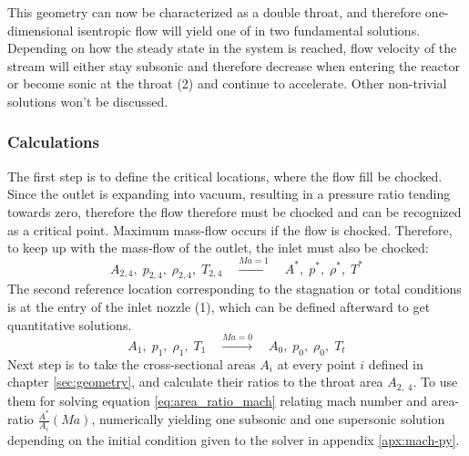 	This geometry can now be characterized as a double throat, and therefore one-dimensional isentropic flow will yield one of in two fundamental solutions.
	Depending on how the steady state in the system is reached, flow velocity of the stream will either stay subsonic and therefore decrease when entering the reactor or become sonic at the throat (2) and continue to accelerate.
	Other non-trivial solutions won't be discussed.
	\cite{SALAS1986193, EMMONS1958}

\subsubsection*{Calculations}

	The first step is to define the critical locations, where the flow fill be chocked.
	Since the outlet is expanding into vacuum, resulting in a pressure ratio tending towards zero, therefore the flow therefore must be chocked and can be recognized as a critical point.
	Maximum mass-flow occurs if the flow is chocked. Therefore, to keep up with the mass-flow of the outlet, the inlet must also be chocked: 
	$$
		A_{2,4},\;p_{2,4},\;\rho_{2,4},\;T_{2,4}
			\quad \xrightarrow {Ma = 1} \quad
		A^*,\;p^*,\;\rho^*,\;T^*
	$$
	The second reference location corresponding to the stagnation or total conditions is at the entry of the inlet nozzle (1), which can be defined afterward to get quantitative solutions.
	$$
		A_1,\;p_1,\;\rho_1,\;T_1
			\quad \xrightarrow{Ma=0} \quad
		A_0,\;p_0,\;\rho_0,\;T_t
	$$
	Next step is to take the cross-sectional areas $A_i$ at every point $i$ defined in chapter \ref{sec:geometry}, and calculate their ratios to the throat area $A_{2,\;4}$.
	To use them for solving equation \eqref{eq:area_ratio_mach} relating mach number and area-ratio $\frac{A^*}{A_i}(Ma)$, numerically yielding one subsonic and one supersonic solution depending on the initial condition given to the solver in appendix \ref{apx:mach-py}.

